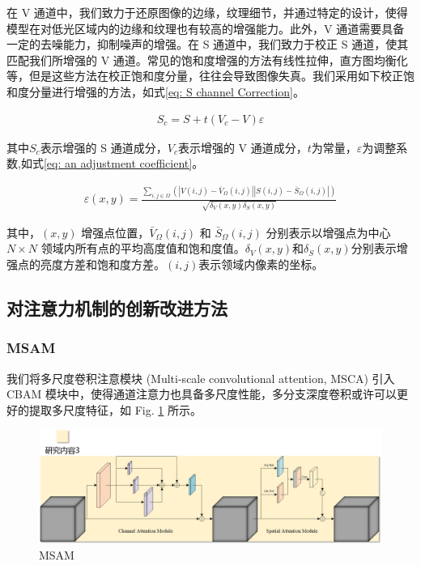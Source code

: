 \documentclass[a4paper]{ctexart}
\begin{document}
	在 V 通道中，我们致力于还原图像的边缘，纹理细节，并通过特定的设计，使得模型在对低光区域内的边缘和纹理也有较高的增强能力。此外，V 通道需要具备一定的去噪能力，抑制噪声的增强。在 S 通道中，我们致力于校正 S 通道，使其匹配我们所增强的 V 通道。常见的饱和度增强的方法有线性拉伸，直方图均衡化等，但是这些方法在校正饱和度分量，往往会导致图像失真。我们采用如下校正饱和度分量进行增强的方法，如式\ref{eq: S channel Correction}。
	
	\begin{equation}
		\begin{aligned}
			S_{c} = S + t(V_{c} - V)\varepsilon
		\end{aligned}
		\label{eq: S channel Correction}
	\end{equation}
	
	其中$S_{c}$表示增强的 S 通道成分，$V_{c}$表示增强的 V 通道成分，$t$为常量，$\varepsilon$为调整系数,如式\ref{eq: an adjustment coefficient}。
	
	\begin{equation}
		\begin{aligned}
			\varepsilon (x, y) = \frac{\sum\limits_{i,j \in \Omega} \left(\left|V(i,j)-\bar{V}_{\Omega}(i,j)\right|\left|S(i,j)-\bar{S}_{\Omega}(i,j)\right|\right)}{\sqrt{\delta_{V}(x,y)\delta_{S}(x,y)}}
		\end{aligned}
		\label{eq: an adjustment coefficient}
	\end{equation}
	
	其中，$(x,y)$ 增强点位置，$\bar{V}_{\Omega}(i,j)$ 和 $\bar{S}_{\Omega}(i,j)$ 分别表示以增强点为中心 $N \times N$ 领域内所有点的平均高度值和饱和度值。$\delta_{V}(x,y)$和$\delta_{S}(x,y)$分别表示增强点的亮度方差和饱和度方差。$(i,j)$表示领域内像素的坐标。
	
	
	\FloatBarrier
	
	\subsection*{对注意力机制的创新改进方法}
	
	\subsubsection*{MSAM}
	
	我们将多尺度卷积注意模块 (Multi-scale convolutional attention, MSCA) 引入 CBAM 模块中，使得通道注意力也具备多尺度性能，多分支深度卷积或许可以更好的提取多尺度特征，如 Fig. \ref{fig: MSAM} 所示。
	
	\begin{figure}[htbp]
		\centering
		\includegraphics[width=0.8\linewidth]{picture/LLIE/Experiment/Attention/MSAM}
		\caption{MSAM}
		\label{fig: MSAM}
	\end{figure}
	
\end{document}

